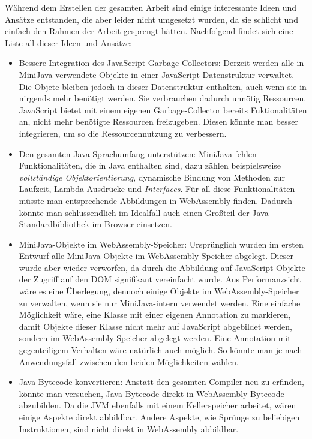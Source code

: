 Während dem Erstellen der gesamten Arbeit sind einige interessante Ideen und Ansätze entstanden, die aber leider nicht umgesetzt wurden, da sie schlicht und einfach den Rahmen der Arbeit gesprengt hätten. Nachfolgend findet sich eine Liste all dieser Ideen und Ansätze:
\begin{itemize}
    \item Bessere Integration des JavaScript-Garbage-Collectors: Derzeit werden alle in MiniJava verwendete Objekte in einer JavaScript-Datenstruktur verwaltet. Die Objete bleiben jedoch in dieser Datenstruktur enthalten, auch wenn sie in nirgends mehr benötigt werden. Sie verbrauchen dadurch unnötig Ressourcen. JavaScript bietet mit einem eigenen Garbage-Collector bereits Fuktionalitäten an, nicht mehr benötigte Ressourcen freizugeben. Diesen könnte man besser integrieren, um so die Ressourcennutzung zu verbessern.
    \item Den gesamten Java-Sprachumfang unterstützen: MiniJava fehlen Funktionalitäten, die in Java enthalten sind, dazu zählen beispielsweise \emph{vollständige Objektorientierung}, dynamische Bindung von Methoden zur Laufzeit, Lambda-Ausdrücke und \emph{Interfaces}. Für all diese Funktionalitäten müsste man entsprechende Abbildungen in WebAssembly finden. Dadurch könnte man schlussendlich im Idealfall auch einen Großteil der Java-Standardbibliothek im Browser einsetzen.
    \item MiniJava-Objekte im WebAssembly-Speicher: Ursprünglich wurden im ersten Entwurf alle MiniJava-Objekte im WebAssembly-Speicher abgelegt. Dieser wurde aber wieder verworfen, da durch die Abbildung auf JavaScript-Objekte der Zugriff auf den DOM signifikant vereinfacht wurde. Aus Performanzsicht wäre es eine Überlegung, dennoch einige Objekte im WebAssembly-Speicher zu verwalten, wenn sie nur MiniJava-intern verwendet werden. Eine einfache Möglichkeit wäre, eine Klasse mit einer eigenen Annotation zu markieren, damit Objekte dieser Klasse nicht mehr auf JavaScript abgebildet werden, sondern im WebAssembly-Speicher abgelegt werden. Eine Annotation mit gegenteiligem Verhalten wäre natürlich auch möglich. So könnte man je nach Anwendungsfall zwischen den beiden Möglichkeiten wählen.
    \item Java-Bytecode konvertieren: Anstatt den gesamten Compiler neu zu erfinden, könnte man versuchen, Java-Bytecode direkt in WebAssembly-Bytecode abzubilden. Da die JVM ebenfalls mit einem Kellerspeicher arbeitet, wären einige Aspekte direkt abbildbar. Andere Aspekte, wie Sprünge zu beliebigen Instruktionen, sind nicht direkt in WebAssembly abbildbar.

\end{itemize}
